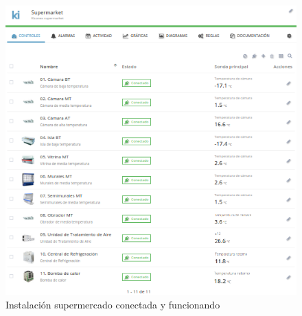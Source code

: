 \begin{figure}[H]
  \centering
  \includegraphics[width=\textwidth, keepaspectratio]{img/instalacionConectada}
  \caption{Instalación supermercado conectada y funcionando}
  \label{figura:instalcionConectada}
\end{figure}

\vspace*{\fill}